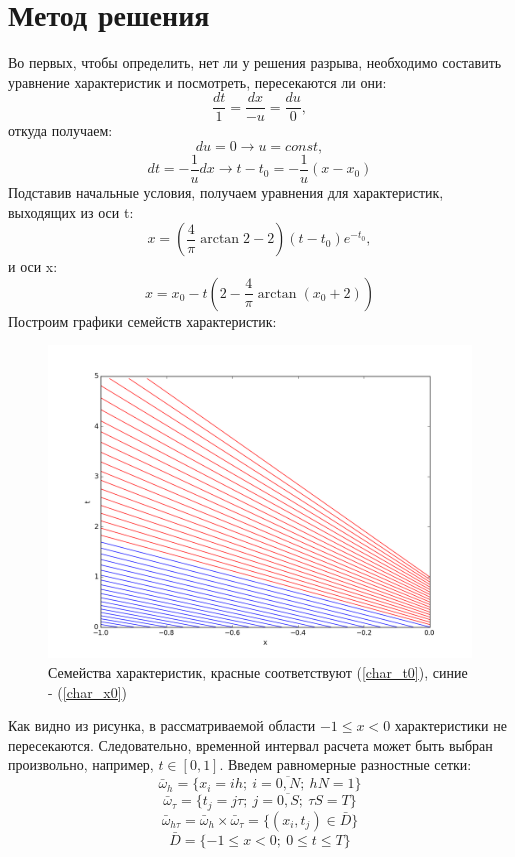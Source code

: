 \documentclass[12pt]{article}
\begin{document}
	\section{Метод решения}
		Во первых, чтобы определить, нет ли у решения разрыва, необходимо составить уравнение характеристик и посмотреть, пересекаются ли они:
		$$ \frac{dt}{1} = \frac{dx}{-u} = \frac{du}{0},$$
		откуда получаем:
		$$ du = 0 \rightarrow u = const,$$
		$$ dt = -\frac{1}{u}dx \rightarrow t - t_0 = -\frac{1}{u}(x - x_0)$$
		Подставив начальные условия, получаем уравнения для характеристик, выходящих из оси t:
		\begin{equation}\label{char_t0}
			x = (\frac{4}{\pi}\arctan2-2)(t-t_0)e^{-t_0},
		\end{equation}
		и оси x:
		\begin{equation}\label{char_x0}
			x = x_0 - t(2 - \frac{4}{\pi}\arctan(x_0+2))
		\end{equation}
		Построим графики семейств характеристик:
		\newpage
		\begin{figure}[h]
			\includegraphics[scale = 0.5]{char_1}
			\caption{Семейства характеристик, красные соответствуют (\ref{char_t0}), синие - (\ref{char_x0})}
		\end{figure}
		Как видно из рисунка, в рассматриваемой области $ -1 \leq x < 0 $ характеристики не пересекаются. Следовательно, временной интервал расчета может быть выбран произвольно, например, $t \in [0, 1]$.
		Введем равномерные разностные сетки:
		$$\bar{\omega}_h = \{x_i = ih;\ i = \overline{0,N};\ hN = 1\}$$
		$$\bar{\omega}_\tau = \{t_j = j\tau;\ j =\overline{0,S};\ \tau S = T\}$$
		$$\bar{\omega}_{h\tau} = \bar{\omega}_h \times \bar{\omega}_\tau = 
		\{ (x_i, t_j) \in \bar{D} \}$$
		$$\bar{D} = \{ -1 \le x < 0;\ 0 \le t \le T \}$$
		
\end{document}

